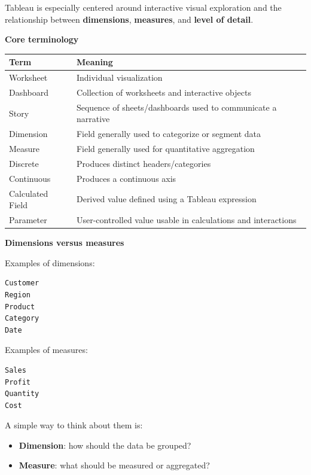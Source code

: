 \documentclass[11pt,letterpaper]{article}
\begin{document}
Tableau is especially centered around interactive visual exploration and the
relationship between \textbf{dimensions}, \textbf{measures}, and
\textbf{level of detail}.



\textbf{Core terminology}

\begin{center}
\begin{tabularx}{\textwidth}{lX}
\toprule
Term & Meaning \\
\midrule
Worksheet & Individual visualization \\
Dashboard & Collection of worksheets and interactive objects \\
Story & Sequence of sheets/dashboards used to communicate a narrative \\
Dimension & Field generally used to categorize or segment data \\
Measure & Field generally used for quantitative aggregation \\
Discrete & Produces distinct headers/categories \\
Continuous & Produces a continuous axis \\
Calculated Field & Derived value defined using a Tableau expression \\
Parameter & User-controlled value usable in calculations and interactions \\
\bottomrule
\end{tabularx}
\end{center}



\textbf{Dimensions versus measures}

Examples of dimensions:

\begin{lstlisting}
Customer
Region
Product
Category
Date
\end{lstlisting}

Examples of measures:

\begin{lstlisting}
Sales
Profit
Quantity
Cost
\end{lstlisting}

A simple way to think about them is:

\begin{itemize}[leftmargin=*]
    \item \textbf{Dimension}: how should the data be grouped?
    \item \textbf{Measure}: what should be measured or aggregated?
\end{itemize}
\end{document}

